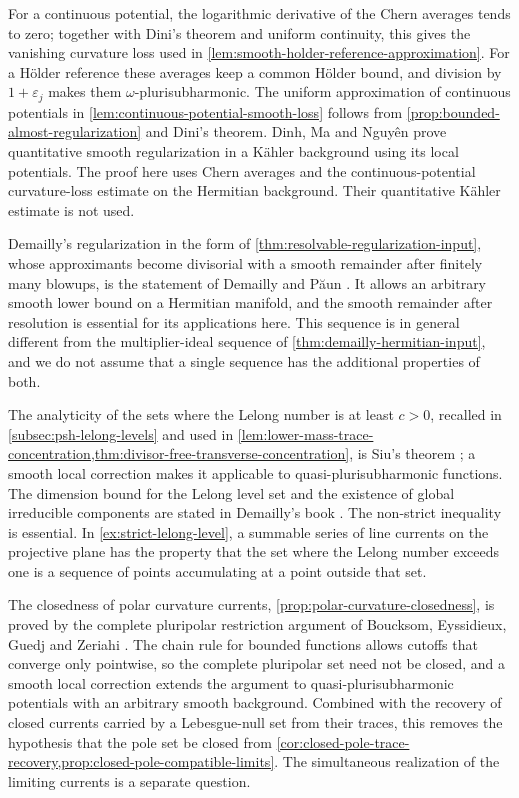 For a continuous potential, the logarithmic derivative of the Chern averages tends to zero; together with Dini's theorem and uniform continuity, this gives the vanishing curvature loss used in \cref{lem:smooth-holder-reference-approximation}. For a H\"older reference these averages keep a common H\"older bound, and division by $1+\varepsilon_j$ makes them $\omega$-plurisubharmonic. The uniform approximation of continuous potentials in \cref{lem:continuous-potential-smooth-loss} follows from \cref{prop:bounded-almost-regularization} and Dini's theorem. Dinh, Ma and Nguy{\^e}n \cite[Theorem~2.1, pp.~551--555]{DMNFekete17} prove quantitative smooth regularization in a K\"ahler background using its local potentials. The proof here uses Chern averages and the continuous-potential curvature-loss estimate on the Hermitian background. Their quantitative K\"ahler estimate is not used.

Demailly's regularization in the form of \cref{thm:resolvable-regularization-input}, whose approximants become divisorial with a smooth remainder after finitely many blowups, is the statement of Demailly and P{\u a}un \cite[Theorem 3.2]{DP04}. It allows an arbitrary smooth lower bound on a Hermitian manifold, and the smooth remainder after resolution is essential for its applications here. This sequence is in general different from the multiplier-ideal sequence of \cref{thm:demailly-hermitian-input}, and we do not assume that a single sequence has the additional properties of both.

The analyticity of the sets where the Lelong number is at least $c>0$, recalled in \cref{subsec:psh-lelong-levels} and used in \cref{lem:lower-mass-trace-concentration,thm:divisor-free-transverse-concentration}, is Siu's theorem \cite[Main Theorem, p.~53]{Siu74}; a smooth local correction makes it applicable to quasi-plurisubharmonic functions. The dimension bound for the Lelong level set and the existence of global irreducible components are stated in Demailly's book \cite[Chapter III, Corollary~8.5, p.~174; Chapter II, Theorem~5.3, pp.~102--103]{DemCADG}. The non-strict inequality is essential. In \cref{ex:strict-lelong-level}, a summable series of line currents on the projective plane has the property that the set where the Lelong number exceeds one is a sequence of points accumulating at a point outside that set.

The closedness of polar curvature currents, \cref{prop:polar-curvature-closedness}, is proved by the complete pluripolar restriction argument of Boucksom, Eyssidieux, Guedj and Zeriahi \cite[Theorem~1.8, Lemma~1.9 and Remark~1.10, pp.~207--210]{BEGZ10}. The chain rule for bounded functions allows cutoffs that converge only pointwise, so the complete pluripolar set need not be closed, and a smooth local correction extends the argument to quasi-plurisubharmonic potentials with an arbitrary smooth background. Combined with the recovery of closed currents carried by a Lebesgue-null set from their traces, this removes the hypothesis that the pole set be closed from \cref{cor:closed-pole-trace-recovery,prop:closed-pole-compatible-limits}. The simultaneous realization of the limiting currents is a separate question.

